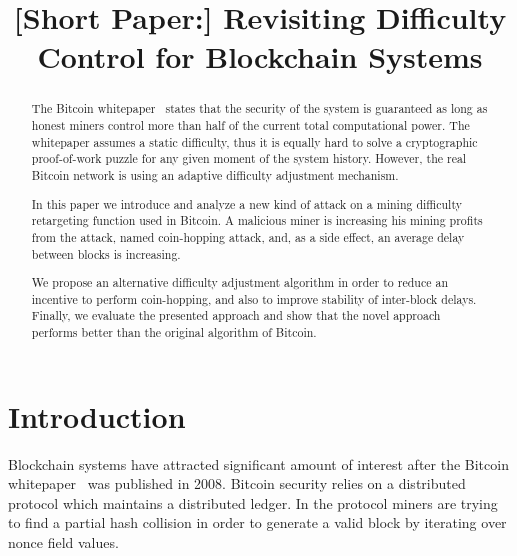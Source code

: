 \documentclass[]{llncs}
\newcommand{\block}{\mathcal{B}}
\begin{document}
\title{[Short Paper:] Revisiting Difficulty Control for Blockchain Systems}




\maketitle

\begin{abstract}

The Bitcoin whitepaper~\cite{Nakamoto2008} states that the security of the system is guaranteed as long as honest miners control more than half of the current total computational power. The whitepaper assumes a static difficulty, thus it is equally hard to solve a cryptographic proof-of-work puzzle for any given moment of the system history. However, the real Bitcoin network is using an adaptive difficulty adjustment mechanism.  

In this paper we introduce and analyze a new kind of attack on a mining difficulty retargeting function used in Bitcoin. A malicious miner is increasing his mining profits from the attack, named coin-hopping attack, and, as a side effect, an average delay between blocks is increasing.

We propose an alternative difficulty adjustment algorithm in order to reduce an incentive to perform coin-hopping, and also to improve stability of inter-block delays. Finally, we evaluate the presented approach and show that the novel approach performs better than the original algorithm of Bitcoin.
	
\end{abstract}


\section{Introduction}
\label{sec:intro}

Blockchain systems have attracted significant amount of interest after the Bitcoin whitepaper~\cite{Nakamoto2008} was published in 2008.
Bitcoin security relies on a distributed protocol which maintains a distributed ledger. In the protocol miners are trying to find a partial hash collision in order to generate a valid block by iterating over nonce field values. 
\end{document}
